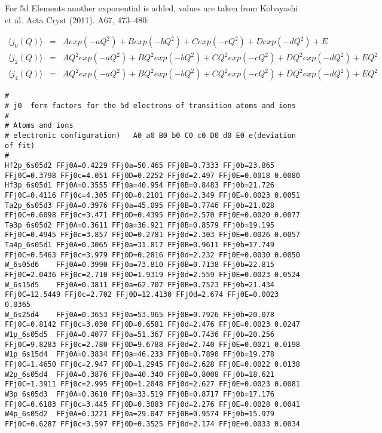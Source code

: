For 5d Elements another exponential is added, values are taken from Kobayashi et al.
Acta Cryst (2011). A67, 473–480:

\begin{eqnarray}
\langle j_0(Q) \rangle&=&A exp(-aQ^2)+B exp(-bQ^2)+C exp(-cQ^2)+D exp(-dQ^2)+E \\
\langle j_2(Q) \rangle&=&A Q^2 exp(-aQ^2)+B Q^2 exp(-bQ^2)+C Q^2 exp(-cQ^2)+D Q^2 exp(-dQ^2)+ E Q^2 \\
\langle j_4(Q) \rangle&=&A Q^2 exp(-aQ^2)+B Q^2 exp(-bQ^2)+C Q^2 exp(-cQ^2)+D Q^2 exp(-dQ^2)+ E Q^2 
\end{eqnarray}

{\scriptsize
\begin{verbatim}
#
# j0  form factors for the 5d electrons of transition atoms and ions  
#
# Atoms and ions
#￼electronic configuration)   A0 a0 B0 b0 C0 c0 D0 d0 E0 e(deviation of fit)
#
Hf2p_6s05d2 FFj0A=0.4229 FFj0a=50.465 FFj0B=0.7333 FFj0b=23.865 FFj0C=0.3798 FFj0c=4.051 FFj0D=0.2252 FFj0d=2.497 FFj0E=0.0018 0.0080
Hf3p_6s05d1 FFj0A=0.3555 FFj0a=40.954 FFj0B=0.8483 FFj0b=21.726 FFj0C=0.4116 FFj0c=4.305 FFj0D=0.2101 FFj0d=2.349 FFj0E=0.0023 0.0051
Ta2p_6s05d3 FFj0A=0.3976 FFj0a=45.095 FFj0B=0.7746 FFj0b=21.028 FFj0C=0.6098 FFj0c=3.471 FFj0D=0.4395 FFj0d=2.570 FFj0E=0.0020 0.0077
Ta3p_6s05d2 FFj0A=0.3611 FFj0a=36.921 FFj0B=0.8579 FFj0b=19.195 FFj0C=0.4945 FFj0c=3.857 FFj0D=0.2781 FFj0d=2.303 FFj0E=0.0026 0.0057
Ta4p_6s05d1 FFj0A=0.3065 FFj0a=31.817 FFj0B=0.9611 FFj0b=17.749 FFj0C=0.5463 FFj0c=3.979 FFj0D=0.2816 FFj0d=2.232 FFj0E=0.0030 0.0050
W_6s05d6    FFj0A=0.3990 FFj0a=73.810 FFj0B=0.7138 FFj0b=22.815 FFj0C=2.0436 FFj0c=2.710 FFj0D=1.9319 FFj0d=2.559 FFj0E=0.0023 0.0524
W_6s15d5    FFj0A=0.3811 FFj0a=62.707 FFj0B=0.7523 FFj0b=21.434 FFj0C=12.5449 FFj0c=2.702 FFj0D=12.4130 FFj0d=2.674 FFj0E=0.0023 0.0365
W_6s25d4    FFj0A=0.3653 FFj0a=53.965 FFj0B=0.7926 FFj0b=20.078 FFj0C=0.8142 FFj0c=3.030 FFj0D=0.6581 FFj0d=2.476 FFj0E=0.0023 0.0247
W1p_6s05d5  FFj0A=0.4077 FFj0a=51.367 FFj0B=0.7436 FFj0b=20.256 FFj0C=9.8283 FFj0c=2.780 FFj0D=9.6788 FFj0d=2.740 FFj0E=0.0021 0.0198
W1p_6s15d4  FFj0A=0.3834 FFj0a=46.233 FFj0B=0.7890 FFj0b=19.278 FFj0C=1.4650 FFj0c=2.947 FFj0D=1.2945 FFj0d=2.628 FFj0E=0.0022 0.0138
W2p_6s05d4  FFj0A=0.3876 FFj0a=40.340 FFj0B=0.8008 FFj0b=18.621 FFj0C=1.3911 FFj0c=2.995 FFj0D=1.2048 FFj0d=2.627 FFj0E=0.0023 0.0081
W3p_6s05d3  FFj0A=0.3610 FFj0a=33.519 FFj0B=0.8717 FFj0b=17.176 FFj0C=0.6183 FFj0c=3.445 FFj0D=0.3883 FFj0d=2.276 FFj0E=0.0028 0.0041
W4p_6s05d2  FFj0A=0.3221 FFj0a=29.047 FFj0B=0.9574 FFj0b=15.979 FFj0C=0.6287 FFj0c=3.597 FFj0D=0.3525 FFj0d=2.174 FFj0E=0.0033 0.0034

\end{verbatim}}
